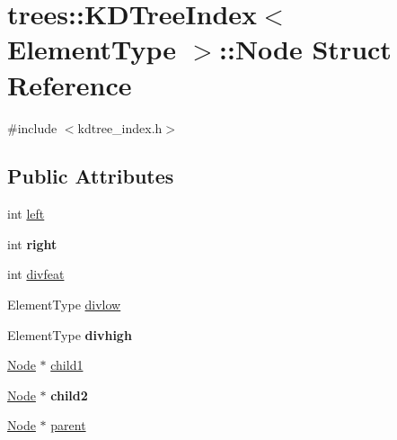 \hypertarget{structtrees_1_1_k_d_tree_index_1_1_node}{}\section{trees\+:\+:K\+D\+Tree\+Index$<$ Element\+Type $>$\+:\+:Node Struct Reference}
\label{structtrees_1_1_k_d_tree_index_1_1_node}


{\ttfamily \#include $<$kdtree\+\_\+index.\+h$>$}

\subsection*{Public Attributes}
\begin{DoxyCompactItemize}
\item 
int \hyperlink{structtrees_1_1_k_d_tree_index_1_1_node_aae063499d92e644cfc075f9c151b185b}{left}
\item 
\mbox{\label{structtrees_1_1_k_d_tree_index_1_1_node_a601b2967dc00c2c31217edf6d00a4edc}} 
int {\bfseries right}
\item 
int \hyperlink{structtrees_1_1_k_d_tree_index_1_1_node_a74e21eb4490a4c6096de83affb7a4867}{divfeat}
\item 
Element\+Type \hyperlink{structtrees_1_1_k_d_tree_index_1_1_node_aa80b732e6a6da3c9d43b09efdf949a06}{divlow}
\item 
\mbox{\label{structtrees_1_1_k_d_tree_index_1_1_node_a8b613dd555800178d8cc871a3bf39b85}} 
Element\+Type {\bfseries divhigh}
\item 
\hyperlink{structtrees_1_1_k_d_tree_index_1_1_node}{Node} $\ast$ \hyperlink{structtrees_1_1_k_d_tree_index_1_1_node_aa210b66e05f8a061872e46893dbb614e}{child1}
\item 
\mbox{\label{structtrees_1_1_k_d_tree_index_1_1_node_ade8a4b109317e4059ee99f89aad390dd}} 
\hyperlink{structtrees_1_1_k_d_tree_index_1_1_node}{Node} $\ast$ {\bfseries child2}
\item 
\hyperlink{structtrees_1_1_k_d_tree_index_1_1_node}{Node} $\ast$ \hyperlink{structtrees_1_1_k_d_tree_index_1_1_node_a987f89ac48760137312cf2aca0ca8b14}{parent}
\end{DoxyCompactItemize}



